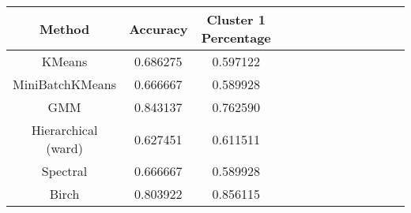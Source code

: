 \begin{tabular}{ccccccccccccc}
\toprule
             Method &  Accuracy &  Cluster 1 Percentage \\
\midrule
             KMeans &  0.686275 &              0.597122 \\
    MiniBatchKMeans &  0.666667 &              0.589928 \\
                GMM &  0.843137 &              0.762590 \\
Hierarchical (ward) &  0.627451 &              0.611511 \\
           Spectral &  0.666667 &              0.589928 \\
              Birch &  0.803922 &              0.856115 \\
\bottomrule
\end{tabular}
